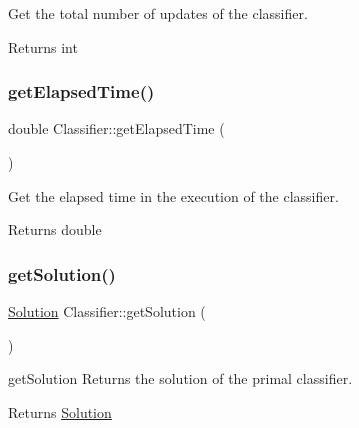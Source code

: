 Get the total number of updates of the classifier. 

\begin{DoxyReturn}{Returns}
int 
\end{DoxyReturn}
\mbox{\label{class_classifier_ab47b67b061041193aa3ae2a7856f4980}} 
\subsubsection{\texorpdfstring{get\+Elapsed\+Time()}{getElapsedTime()}}
{\footnotesize\ttfamily double Classifier\+::get\+Elapsed\+Time (\begin{DoxyParamCaption}{ }\end{DoxyParamCaption})\hspace{0.3cm}{\ttfamily [inline]}}



Get the elapsed time in the execution of the classifier. 

\begin{DoxyReturn}{Returns}
double 
\end{DoxyReturn}
\mbox{\label{class_classifier_afd2b54ada10af9f4be1c4d326b180dc7}} 
\subsubsection{\texorpdfstring{get\+Solution()}{getSolution()}}
{\footnotesize\ttfamily \hyperlink{class_solution}{Solution} Classifier\+::get\+Solution (\begin{DoxyParamCaption}{ }\end{DoxyParamCaption})}



get\+Solution Returns the solution of the primal classifier. 

\begin{DoxyReturn}{Returns}
\hyperlink{class_solution}{Solution} 
\end{DoxyReturn}
\mbox{\label{class_classifier_a1fb3e4dfd80c154e89603c8fa1b11b76}} 
